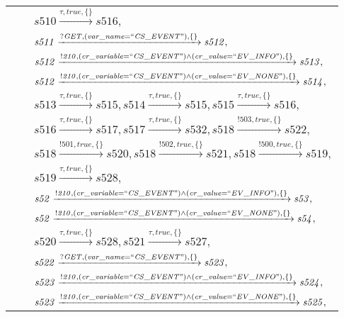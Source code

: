 \begin{tabular}{lcl}
& & $\mathit{s510}\xrightarrow{\mathit{\tau}, \mathit{true}, \{\}}\mathit{s516},$ \\
& & $\mathit{s511}\xrightarrow{\mathit{?GET}, \mathit{(var\_name = ``CS\_EVENT")}, \{\}}\mathit{s512},$ \\
& & $\mathit{s512}\xrightarrow{\mathit{!210}, \mathit{(cr\_variable = ``CS\_EVENT") \land (cr\_value = ``EV\_INFO")}, \{\}}\mathit{s513},$ \\
& & $\mathit{s512}\xrightarrow{\mathit{!210}, \mathit{(cr\_variable = ``CS\_EVENT") \land (cr\_value = ``EV\_NONE")}, \{\}}\mathit{s514},$ \\
& & $\mathit{s513}\xrightarrow{\mathit{\tau}, \mathit{true}, \{\}}\mathit{s515},\mathit{s514}\xrightarrow{\mathit{\tau}, \mathit{true}, \{\}}\mathit{s515},\mathit{s515}\xrightarrow{\mathit{\tau}, \mathit{true}, \{\}}\mathit{s516},$ \\
& & $\mathit{s516}\xrightarrow{\mathit{\tau}, \mathit{true}, \{\}}\mathit{s517},\mathit{s517}\xrightarrow{\mathit{\tau}, \mathit{true}, \{\}}\mathit{s532},\mathit{s518}\xrightarrow{\mathit{!503}, \mathit{true}, \{\}}\mathit{s522},$ \\
& & $\mathit{s518}\xrightarrow{\mathit{!501}, \mathit{true}, \{\}}\mathit{s520},\mathit{s518}\xrightarrow{\mathit{!502}, \mathit{true}, \{\}}\mathit{s521},\mathit{s518}\xrightarrow{\mathit{!500}, \mathit{true}, \{\}}\mathit{s519},$ \\
& & $\mathit{s519}\xrightarrow{\mathit{\tau}, \mathit{true}, \{\}}\mathit{s528},$ \\
& & $\mathit{s52}\xrightarrow{\mathit{!210}, \mathit{(cr\_variable = ``CS\_EVENT") \land (cr\_value = ``EV\_INFO")}, \{\}}\mathit{s53},$ \\
& & $\mathit{s52}\xrightarrow{\mathit{!210}, \mathit{(cr\_variable = ``CS\_EVENT") \land (cr\_value = ``EV\_NONE")}, \{\}}\mathit{s54},$ \\
& & $\mathit{s520}\xrightarrow{\mathit{\tau}, \mathit{true}, \{\}}\mathit{s528},\mathit{s521}\xrightarrow{\mathit{\tau}, \mathit{true}, \{\}}\mathit{s527},$ \\
& & $\mathit{s522}\xrightarrow{\mathit{?GET}, \mathit{(var\_name = ``CS\_EVENT")}, \{\}}\mathit{s523},$ \\
& & $\mathit{s523}\xrightarrow{\mathit{!210}, \mathit{(cr\_variable = ``CS\_EVENT") \land (cr\_value = ``EV\_INFO")}, \{\}}\mathit{s524},$ \\
& & $\mathit{s523}\xrightarrow{\mathit{!210}, \mathit{(cr\_variable = ``CS\_EVENT") \land (cr\_value = ``EV\_NONE")}, \{\}}\mathit{s525},$ \\

\end{tabular}
